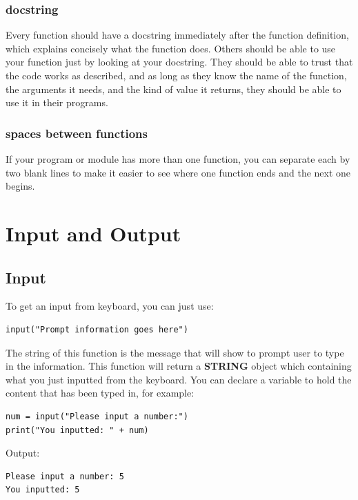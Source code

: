 \documentclass[12pt]{book}
\begin{document}
\subsection{docstring}
\label{sec:orgb144302}
Every function should have a docstring immediately after the function definition, which explains concisely what the function does. Others should be able to use your function just by looking at your docstring. They should be able to trust that the code works as described, and as long as they know the name of the function, the arguments it needs, and the kind of value it returns, they should be able to use it in their programs.
\subsection{spaces between functions}
\label{sec:org2e1e5ae}
If your program or module has more than one function, you can separate each by two blank lines to make it easier to see where one function ends and the next one begins.
\chapter{Input and Output}
\label{sec:org0627670}
\section{Input}
\label{sec:orge197aa7}
To get an input from keyboard, you can just use:
\begin{verbatim}
input("Prompt information goes here")
\end{verbatim}
The string of this function is the message that will show to prompt user to type in the information. This function will return a \textbf{STRING} object which containing what you just inputted from the keyboard. You can declare a variable to hold the content that has been typed in, for example:
\begin{verbatim}
num = input("Please input a number:")
print("You inputted: " + num)
\end{verbatim}
Output:
\begin{verbatim}
Please input a number: 5
You inputted: 5
\end{verbatim}
\end{document}
